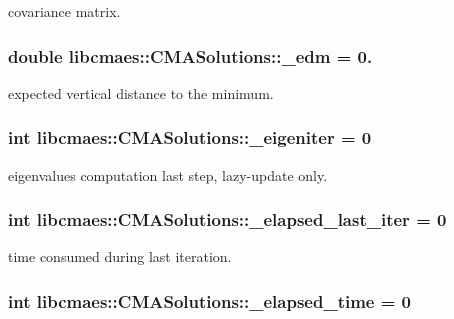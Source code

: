 covariance matrix. \hypertarget{classlibcmaes_1_1CMASolutions_aac9012bc898ffa0398974178bb395a2d}{
\subsubsection[{\-\_\-edm}]{\setlength{\rightskip}{0pt plus 5cm}double libcmaes\-::\-C\-M\-A\-Solutions\-::\-\_\-edm = 0.}}\label{classlibcmaes_1_1CMASolutions_aac9012bc898ffa0398974178bb395a2d}
expected vertical distance to the minimum. \hypertarget{classlibcmaes_1_1CMASolutions_ac042ad718b7fba94a733329228991c4e}{
\subsubsection[{\-\_\-eigeniter}]{\setlength{\rightskip}{0pt plus 5cm}int libcmaes\-::\-C\-M\-A\-Solutions\-::\-\_\-eigeniter = 0}}\label{classlibcmaes_1_1CMASolutions_ac042ad718b7fba94a733329228991c4e}
eigenvalues computation last step, lazy-\/update only. \hypertarget{classlibcmaes_1_1CMASolutions_afb37930765ebc9c577e17d262fb585a6}{
\subsubsection[{\-\_\-elapsed\-\_\-last\-\_\-iter}]{\setlength{\rightskip}{0pt plus 5cm}int libcmaes\-::\-C\-M\-A\-Solutions\-::\-\_\-elapsed\-\_\-last\-\_\-iter = 0}}\label{classlibcmaes_1_1CMASolutions_afb37930765ebc9c577e17d262fb585a6}
time consumed during last iteration. \hypertarget{classlibcmaes_1_1CMASolutions_af3460af057684e25829d8d367fce7ac5}{
\subsubsection[{\-\_\-elapsed\-\_\-time}]{\setlength{\rightskip}{0pt plus 5cm}int libcmaes\-::\-C\-M\-A\-Solutions\-::\-\_\-elapsed\-\_\-time = 0}}\label{classlibcmaes_1_1CMASolutions_af3460af057684e25829d8d367fce7ac5}
